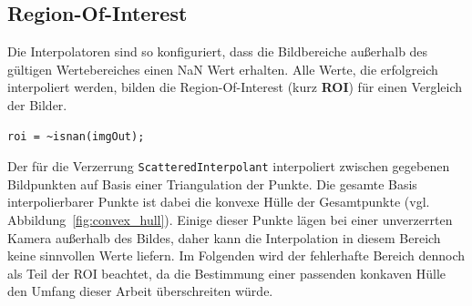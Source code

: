 \subsection{Region-Of-Interest}
\label{sec:roi}
Die Interpolatoren sind so konfiguriert, dass die Bildbereiche außerhalb des gültigen Wertebereiches einen NaN Wert erhalten. Alle Werte, die erfolgreich interpoliert werden, bilden die Region-Of-Interest (kurz \textbf{ROI}) für einen Vergleich der Bilder.
\begin{lstlisting}[style=Matlab-editor,basicstyle=\mlttfamily]
%% Bestimmung der Region of Interest für Entzerrung
roi = ~isnan(imgOut);
\end{lstlisting}
Der für die Verzerrung \texttt{ScatteredInterpolant} interpoliert zwischen gegebenen Bildpunkten auf Basis einer Triangulation der Punkte. Die gesamte Basis interpolierbarer Punkte ist dabei die konvexe Hülle der Gesamtpunkte (vgl. Abbildung~\ref{fig:convex_hull}). Einige dieser Punkte lägen bei einer unverzerrten Kamera außerhalb des Bildes, daher kann die Interpolation in diesem Bereich keine sinnvollen Werte liefern. Im Folgenden wird der fehlerhafte Bereich dennoch als Teil der ROI beachtet, da die Bestimmung einer passenden konkaven Hülle den Umfang dieser Arbeit überschreiten würde.
